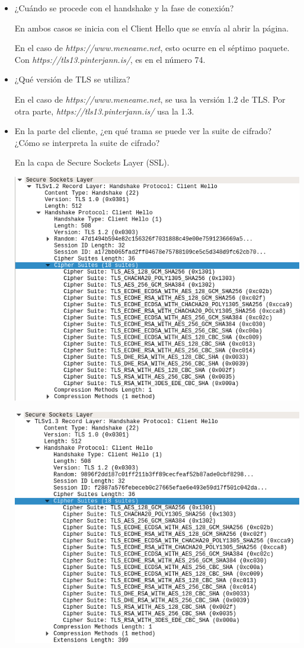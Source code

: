 \documentclass{article}
\begin{document}
\begin{itemize}
\item ¿Cuándo se procede con el handshake y la fase de conexión?

En ambos casos se inicia con el Client Hello que se envía al abrir la página.

En el caso de \textit{https://www.meneame.net}, esto ocurre en el séptimo paquete. Con \textit{https://tls13.pinterjann.is/}, es en el número 74.
\item ¿Qué versión de TLS se utiliza?

En el caso de \textit{https://www.meneame.net}, se usa la versión 1.2 de TLS. Por otra parte, \textit{https://tls13.pinterjann.is/} usa la 1.3.
\item En la parte del cliente, ¿en qué trama se puede ver la suite de cifrado? ¿Cómo se interpreta la suite de cifrado?

En la capa de Secure Sockets Layer (SSL).

\begin{center}
\includegraphics[scale=0.4]{suites.png}
\end{center}

\begin{center}
\includegraphics[scale=0.35]{suites2.png}
\end{center}


\end{itemize}
\end{document}
